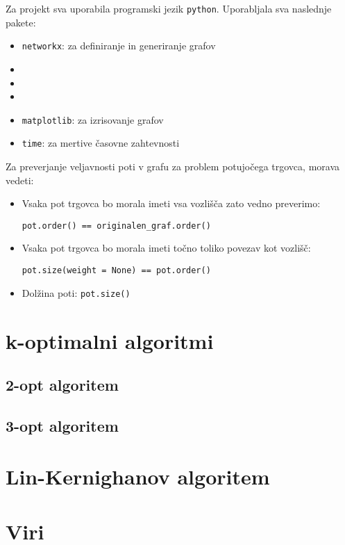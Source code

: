 \documentclass[12pt, a4paper]{article}
\begin{document}
Za projekt sva uporabila programski jezik \texttt{python}. Uporabljala sva naslednje pakete:

\begin{itemize}

\item \texttt{networkx}: za definiranje in generiranje grafov

\item \texttt{}

\item \texttt{}

\item \texttt{}

\item \texttt{matplotlib}: za izrisovanje grafov

\item \texttt{time}: za mertive časovne zahtevnosti

\end{itemize}

Za preverjanje veljavnosti poti v grafu za problem potujočega trgovca, morava vedeti:

\begin{itemize}

\item Vsaka pot trgovca bo morala imeti vsa vozlišča zato vedno preverimo:
\begin{center}
\texttt{pot.order() == originalen\_graf.order()}
\end{center}
\item Vsaka pot trgovca bo morala imeti točno toliko povezav kot vozlišč:
\begin{center}
\texttt{pot.size(weight = None) == pot.order()} 
\end{center}
\item Dolžina poti: \texttt{pot.size()}

\end{itemize}











\newpage
\section[k-optimalni algoritmi]{k-optimalni algoritmi}

\subsection[2-opt algoritem]{2-opt algoritem}

\subsection[3-opt algoritem]{3-opt algoritem}

\newpage
\section[Lin-Kernighanov algoritem]{Lin-Kernighanov algoritem}

\newpage
\section[Viri]{Viri}
\end{document}
